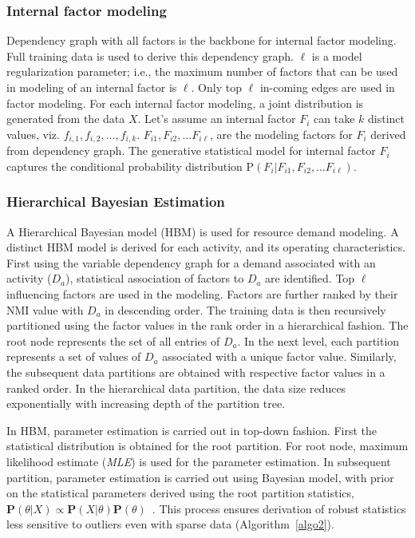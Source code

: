 \documentclass[twoside,leqno,twocolumn]{article}
\begin{document}
\subsubsection{Internal factor modeling}
\label{subsubsec:factor}
Dependency graph with all factors is the backbone for internal factor modeling. Full training data is used to derive this dependency graph.  $\ell$ is a model regularization parameter; i.e., the maximum number of factors that can be used in modeling of an internal factor is $\ell$. Only top $\ell$ in-coming edges are used in factor modeling. For each internal factor modeling, a joint distribution is generated from the data $X$. Let's assume an internal factor $F_{i}$ can take $k$ distinct values, viz. $f_{i,1}, f_{i,2},\dots, f_{i,k}$. $F_{i1}, F_{i2},\dots F_{i\ell}$, are the modeling factors for $F_{i}$ derived from dependency graph. The generative statistical model for internal factor $F_{i}$ captures the conditional probability distribution $\mathrm{P}(F_i\vert F_{i1}, F_{i2},\dots F_{i\ell})$.

\subsubsection{Hierarchical Bayesian Estimation}
\label{subsubsec:hbm}
A Hierarchical Bayesian model (HBM) is used for resource demand modeling. A distinct HBM model is derived for each activity, and its operating characteristics. First using the variable dependency graph for a demand associated with an activity ($D_a$), statistical association of factors to $D_a$ are identified. Top $\ell$ influencing factors are used in the modeling. Factors are further ranked by their NMI value with $D_a$ in descending order. The training data is then recursively partitioned using the factor values in the rank order in a hierarchical fashion. The root node represents the set of all entries of $D_a$. In the next level, each partition represents a set of values of $D_a$  associated with a unique factor value. Similarly, the subsequent data partitions are obtained with respective factor values in a ranked order.  In the hierarchical data partition, the data size reduces exponentially with increasing depth of the partition tree.
\par  
In HBM, parameter estimation is carried out in top-down fashion. First the statistical distribution is obtained for the root partition. For root node, maximum likelihood estimate (\textit{MLE}) is used for the parameter estimation. In subsequent partition, parameter estimation is carried out using Bayesian model, with prior on the statistical parameters derived using the root partition statistics, $\mathbf{P}(\theta \vert X) \propto \mathbf{P}(X\vert\theta)\mathbf{P}(\theta)$~\cite{gelman2013}. This process ensures derivation of robust statistics less sensitive to outliers even with sparse data (Algorithm~\ref{algo2}).
\end{document}
